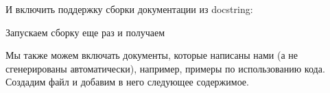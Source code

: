 \documentclass[letterpaper,10pt,russian]{sphinxmanual}
\begin{document}
\sphinxAtStartPar
И включить поддержку сборки документации из docstring:

\begin{sphinxVerbatim}[commandchars=\\\{\}]
  \PYG{p}{[}\PYG{p}{]}
\end{sphinxVerbatim}

\sphinxAtStartPar
Запускаем сборку еще раз и получаем

\sphinxAtStartPar
{}

\sphinxAtStartPar
Мы также можем включать документы, которые написаны нами (а не сгенерированы автоматически), например, примеры по использованию кода. Создадим файл  и добавим в него следующее содержимое.
\end{document}
